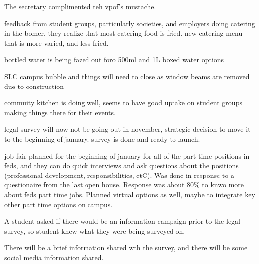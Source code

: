 \begin{information}

    The secretary complimented teh vpof's mustache. 

    feedback from student groups, particularly societies, and employers doing
    catering in the bomer, they realize that most catering food is fried. new
    catering menu that is more varied, and less fried. 

    bottled water is being fazed out foro 500ml and 1L boxed water options

    SLC campus bubble and things will need to close as window beams are removed
    due to construction

    commuity kitchen is doing well, seems to have good uptake on student groups
    making things there for their events. 

    legal survey will now not be going out in november, strategic decision to 
    move it to the beginning of january. survey is done and ready to launch.

    job fair planned for the beginning of january for all of the part time 
    positions in feds, and they can do quick interviews and ask questions
    about the positions (professional development, responsibilities, etC). 
    Was done in response to a questionaire from the last open house. Response
    was about 80\% to knwo more about feds part time jobs. Planned virtual 
    options as well, maybe to integrate key other part time options on campus.

    A student asked if there would be an information campaign prior to the 
    legal survey, so student knew what they were being surveyed on. 

    There will be a brief information shared wth the survey, and there will be
    some social media information shared. 

\end{information}

